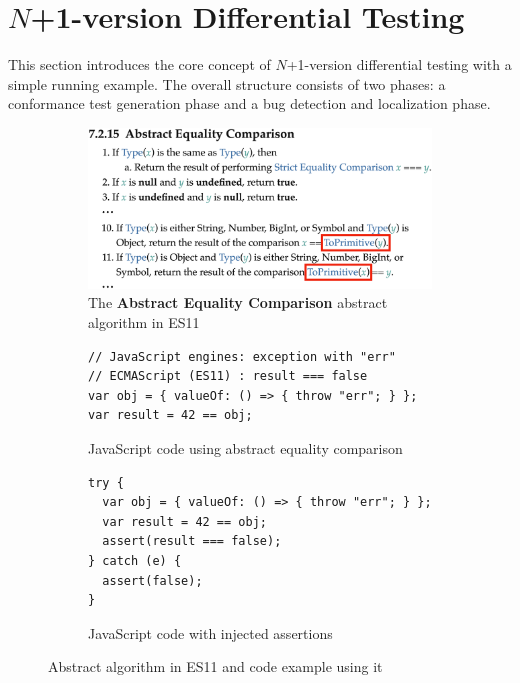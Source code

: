 \section{$N$+1-version Differential Testing}\label{sec:idea}
This section introduces the core concept of $N$+1-version differential testing with a
simple running example.  The overall structure consists of two
phases: a conformance test generation phase and a bug detection and localization
phase.

\begin{figure}[t]
  \centering
  \begin{subfigure}[t]{0.48\textwidth}
    \includegraphics[width=\textwidth]{img/example-algo}
\vspace*{-.5em}
    \caption{The \textbf{Abstract Equality Comparison} abstract algorithm in
    ES11}
    \label{fig:example-algo}
  \end{subfigure}
  \begin{subfigure}[t]{0.43\textwidth}
    \begin{lstlisting}[style=myJSstyle]
// JavaScript engines: exception with "err"
// ECMAScript (ES11) : result === false
var obj = { valueOf: () => { throw "err"; } };
var result = 42 == obj;
    \end{lstlisting}
\vspace*{-.5em}
    \caption{JavaScript code using abstract equality comparison}
    \label{fig:example-js}
  \end{subfigure}
  \begin{subfigure}[t]{0.45\textwidth}
    \begin{lstlisting}[style=myJSstyle]
try {
  var obj = { valueOf: () => { throw "err"; } };
  var result = 42 == obj;
  assert(result === false);
} catch (e) {
  assert(false);
}
    \end{lstlisting}
\vspace*{-1em}
    \caption{JavaScript code with injected assertions}
    \label{fig:example-injected}
  \end{subfigure}
  \caption{Abstract algorithm in ES11 and code example using it}
  \label{fig:example}
  \vspace*{-1em}
\end{figure}


